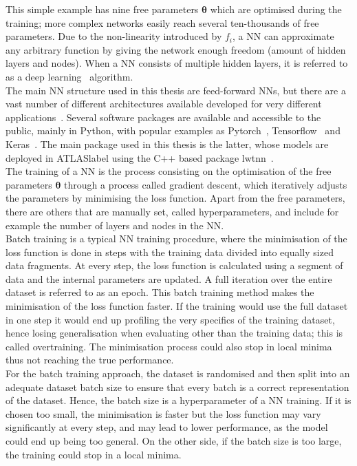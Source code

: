 This simple example has nine free parameters $\boldsymbol{\theta}$ which are optimised during the training; more complex networks easily reach several ten-thousands of free parameters. Due to the non-linearity introduced by $f_i$, a NN can approximate any arbitrary function by giving the network enough freedom (amount of hidden layers and nodes). When a NN consists of multiple hidden layers, it is referred to as a deep learning~\cite{Goodfellow-et-al-2016} algorithm.\\

The main NN structure used in this thesis are feed-forward NNs, but there are a vast number of different architectures available developed for very different applications~\cite{livingreview}. Several software packages are available and accessible to the public,  mainly in Python, with popular examples as Pytorch~\cite{NEURIPS2019_9015}, Tensorflow~\cite{tensorflow2015-whitepaper} and Keras~\cite{chollet2015keras}. The main package used in this thesis is the latter, whose models are deployed in \acrshort{ATLASlabel} using the C++ based package lwtnn~\cite{lwtnn}.\\

The training of a NN is the process consisting on the optimisation of the free parameters $\boldsymbol{\theta}$ through a process called gradient descent, which iteratively adjusts the parameters by minimising the loss function. Apart from the free parameters, there are others that are manually set, called hyperparameters, and include for example the number of layers and nodes in the NN.\\

Batch training is a typical NN training procedure, where the minimisation of the loss function is done in steps with the training data divided into equally sized data fragments. At every step, the loss function is calculated using a segment of data and the internal parameters are updated. A full iteration over the entire dataset is referred to as an epoch. This batch training method makes the minimisation of the loss function faster. If the training would use the full dataset in one step it would end up profiling the very specifics of the training dataset, hence losing generalisation when evaluating other than the training data; this is called overtraining. The minimisation process could also stop in local minima thus not reaching the true performance.\\

For the batch training approach, the dataset is randomised and then split into an adequate dataset batch size to ensure that every batch is a correct representation of the dataset. Hence, the batch size is a hyperparameter of a NN training. If it is chosen too small, the minimisation is faster but the loss function may vary significantly at every step, and may lead to lower performance, as the model could end up being too general. On the other side, if the batch size is too large, the training could stop in a local minima.

